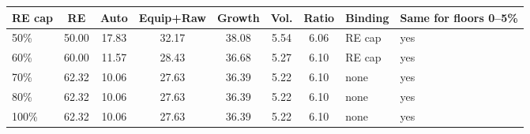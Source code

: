 \begin{tabular}{lccccccll}
\toprule
\textbf{RE cap} & RE & Auto & Equip+Raw & Growth & Vol. & Ratio & Binding & Same for floors 0--5\% \\
\midrule
50\% & 50.00 & 17.83 & 32.17 & 38.08 & 5.54 & 6.06 & RE cap & yes \\
60\% & 60.00 & 11.57 & 28.43 & 36.68 & 5.27 & 6.10 & RE cap & yes \\
70\% & 62.32 & 10.06 & 27.63 & 36.39 & 5.22 & 6.10 & none & yes \\
80\% & 62.32 & 10.06 & 27.63 & 36.39 & 5.22 & 6.10 & none & yes \\
100\% & 62.32 & 10.06 & 27.63 & 36.39 & 5.22 & 6.10 & none & yes \\
\bottomrule
\end{tabular}
